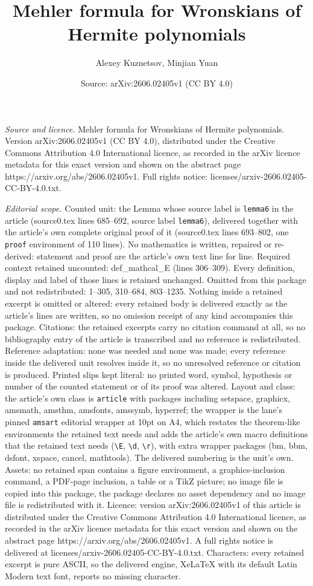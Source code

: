 \documentclass[10pt,a4paper]{amsart}
\title[Mehler formula for Wronskians of Hermite polynomials]{Mehler formula for Wronskians of Hermite polynomials}
\author{Alexey Kuznetsov, Minjian Yuan}
\date{Source: arXiv:2606.02405v1 (CC BY 4.0)}
\begin{document}
\maketitle

\noindent\emph{Source and licence.} Mehler formula for Wronskians of Hermite polynomials. Version arXiv:2606.02405v1 (CC BY 4.0), distributed under the Creative Commons Attribution 4.0 International licence, as recorded in the arXiv licence metadata for this exact version and shown on the abstract page https://arxiv.org/abs/2606.02405v1. Full rights notice: licenses/arxiv-2606.02405-CC-BY-4.0.txt.\par\smallskip

\noindent\textit{Editorial scope.} Counted unit: the Lemma whose source label is \texttt{lemma6} in the article (source0.tex lines 685--692, source label \texttt{lemma6}), delivered together with the article's own complete original proof of it (source0.tex lines 693--802, one \texttt{proof} environment of 110 lines). No mathematics is written, repaired or re-derived: statement and proof are the article's own text line for line. Required context retained uncounted: def\_mathcal\_E (lines 306--309). Every definition, display and label of those lines is retained unchanged. Omitted from this package and not redistributed: 1--305, 310--684, 803--1235. Nothing inside a retained excerpt is omitted or altered: every retained body is delivered exactly as the article's lines are written, so no omission receipt of any kind accompanies this package. Citations: the retained excerpts carry no citation command at all, so no bibliography entry of the article is transcribed and no reference is redistributed. Reference adaptation: none was needed and none was made; every reference inside the delivered unit resolves inside it, so no unresolved reference or citation is produced. Printed slips kept literal: no printed word, symbol, hypothesis or number of the counted statement or of its proof was altered. Layout and class: the article's own class is \texttt{article} with packages including setspace, graphicx, amsmath, amsthm, amsfonts, amssymb, hyperref; the wrapper is the lane's pinned \texttt{amsart} editorial wrapper at 10pt on A4, which restates the theorem-like environments the retained text needs and adds the article's own macro definitions that the retained text needs (\texttt{\textbackslash E}, \texttt{\textbackslash d}, \texttt{\textbackslash r}), with extra wrapper packages (bm, bbm, dsfont, xspace, cancel, mathtools). The delivered numbering is the unit's own. Assets: no retained span contains a figure environment, a graphics-inclusion command, a PDF-page inclusion, a table or a TikZ picture; no image file is copied into this package, the package declares no asset dependency and no image file is redistributed with it. Licence: version arXiv:2606.02405v1 of this article is distributed under the Creative Commons Attribution 4.0 International licence, as recorded in the arXiv licence metadata for this exact version and shown on the abstract page https://arxiv.org/abs/2606.02405v1. A full rights notice is delivered at licenses/arxiv-2606.02405-CC-BY-4.0.txt. Characters: every retained excerpt is pure ASCII, so the delivered engine, XeLaTeX with its default Latin Modern text font, reports no missing character.
\end{document}
